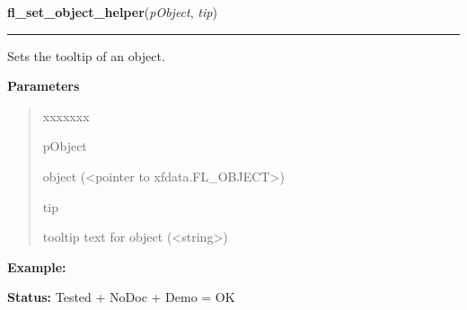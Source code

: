 \hspace{.8\funcindent}\begin{boxedminipage}{\funcwidth}

    \raggedright \textbf{fl\_set\_object\_helper}(\textit{pObject}, \textit{tip})

    \vspace{-1.5ex}

    \rule{\textwidth}{0.5\fboxrule}
\setlength{\parskip}{2ex}
    Sets the tooltip of an object.

\setlength{\parskip}{1ex}
      \textbf{Parameters}
      \vspace{-1ex}

      \begin{quote}
        \begin{Ventry}{xxxxxxx}

          \item[pObject]

          object ({\textless}pointer to xfdata.FL\_OBJECT{\textgreater})

          \item[tip]

          tooltip text for object ({\textless}string{\textgreater})

        \end{Ventry}

      \end{quote}

\textbf{Example:} 

\textbf{Status:} Tested + NoDoc + Demo = OK



    \end{boxedminipage}

    \label{xformslib:library:fl_set_object_position}

    \vspace{0.5ex}


